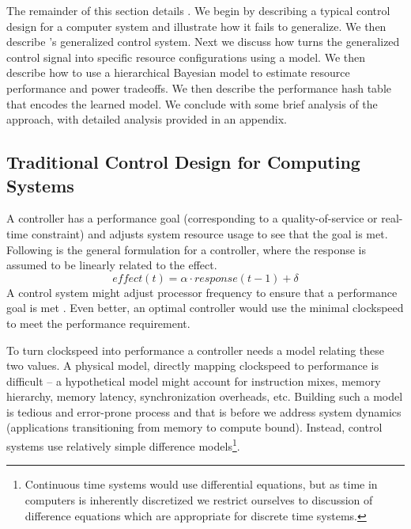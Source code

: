 The remainder of this section details \SYSTEM{}.  We begin by
describing a typical control design for a computer system and
illustrate how it fails to generalize.  We then describe \SYSTEM{}'s
generalized control system.  Next we discuss how \SYSTEM{} turns the
generalized control signal into specific resource configurations using
a model.  We then describe how to use a hierarchical Bayesian model to
estimate resource performance and power tradeoffs.  We then describe
the performance hash table that encodes the learned model. We conclude
with some brief analysis of the approach, with detailed analysis
provided in an appendix.


\subsection{Traditional Control Design for Computing Systems}
A controller has a performance goal (corresponding to a
quality-of-service or real-time constraint) and adjusts system resource
usage to see that the goal is met. Following is the general formulation for a controller, where the response is assumed to be linearly related to the effect.
\begin{equation}
  effect(t) = \alpha \cdot response(t-1) + \delta \label{eqn:clock}
\end{equation}
A control system might adjust processor frequency to ensure that a performance
goal is met \cite{lefurgy}.  Even better, an optimal controller would
use the minimal clockspeed to meet the performance requirement.


To turn clockspeed into performance a controller needs a model
relating these two values.  A physical model, directly mapping clockspeed to performance
is difficult -- a hypothetical model might account for instruction
mixes, memory hierarchy, memory latency, synchronization overheads,
etc.  Building such a model is tedious and error-prone process and
that is before we address system dynamics (\eg applications
transitioning from memory to compute bound).  Instead, control systems
use relatively simple difference models\footnote{Continuous time
  systems would use differential equations, but as time in computers
  is inherently discretized we restrict ourselves to discussion of
  difference equations which are appropriate for discrete time
  systems.}.

